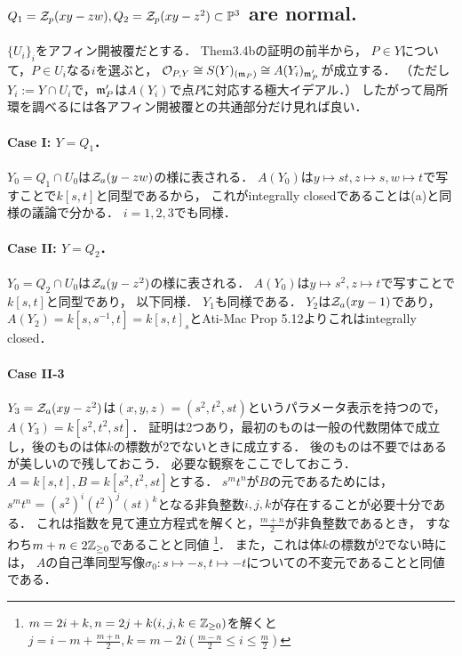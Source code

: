 \documentclass[a4paper]{jsarticle}
\begin{document}

    \subsection{$Q_1=\mathcal{Z}_p(xy-zw), Q_2=\mathcal{Z}_p(xy-z^2) \subset \mathbb{P}^3$ are normal.}
    $\{U_i\}_i$をアフィン開被覆だとする．
    Them3.4bの証明の前半から，
    $P \in Y$について，$P \in U_i$なる$i$を選ぶと，
    $\mathcal{O}_{P,Y} \cong S(Y)_{(\mathfrak{m}_P)} \cong A(Y_i)_{\mathfrak{m}'_P}$が成立する．
    （ただし$Y_i:=Y \cap U_i$で，$\mathfrak{m}'_P$は$A(Y_i)$で点$P$に対応する極大イデアル．）
    したがって局所環を調べるには各アフィン開被覆との共通部分だけ見れば良い．

    \paragraph{Case I: $Y=Q_1$．}
    $Y_0=Q_1 \cap U_0$は$\mathcal{Z}_a(y-zw)$の様に表される．
    $A(Y_0)$は$y \mapsto st, z \mapsto s, w \mapsto t$で写すことで$k[s,t]$と同型であるから，
    これがintegrally closedであることは(a)と同様の議論で分かる．
    $i=1,2,3$でも同様．

    \paragraph{Case II: $Y=Q_2$．}
    $Y_0=Q_2 \cap U_0$は$\mathcal{Z}_a(y-z^2)$の様に表される．
    $A(Y_0)$は$y \mapsto s^2, z \mapsto t$で写すことで$k[s,t]$と同型であり，
    以下同様．
    $Y_1$も同様である．
    $Y_2$は$\mathcal{Z}_a(xy-1)$であり，
    $A(Y_2)=k[s,s^{-1},t]=k[s,t]_{s}$とAti-Mac Prop 5.12よりこれはintegrally closed．

    \paragraph{Case II-3}
    $Y_3=\mathcal{Z}_a(xy-z^2)$は$(x,y,z)=(s^2,t^2,st)$というパラメータ表示を持つので，$A(Y_3)=k[s^2,t^2,st]$．
    証明は2つあり，最初のものは一般の代数閉体で成立し，後のものは体$k$の標数が2でないときに成立する．
    後のものは不要ではあるが美しいので残しておこう．
    必要な観察をここでしておこう．
    $A=k[s,t], B=k[s^2,t^2,st]$とする．
    $s^m t^n$が$B$の元であるためには，
    $s^m t^n=(s^2)^i (t^2)^j (st)^k$となる非負整数$i,j,k$が存在することが必要十分である．
    これは指数を見て連立方程式を解くと，$\frac{m+n}{2}$が非負整数であるとき，
    すなわち$m+n \in 2\mathbb{Z}_{\geq 0}$であることと同値
    \footnote{$m=2i+k, n=2j+k (i,j,k \in \mathbb{Z}_{\geq 0})$を解くと$j=i-m+\frac{m+n}{2}, k=m-2i (\frac{m-n}{2} \leq i \leq \frac{m}{2})$}．
    また，これは体$k$の標数が2でない時には，
    $A$の自己準同型写像$\sigma_0: s \mapsto -s, t \mapsto -t$についての不変元であることと同値である．
\end{document}
